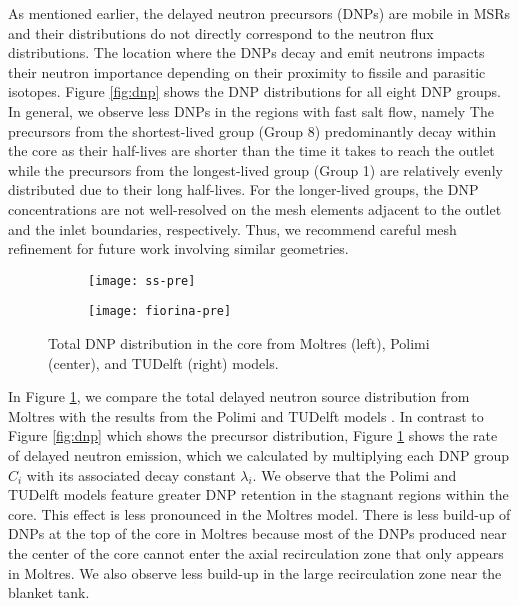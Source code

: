 As mentioned earlier, the delayed neutron precursors (DNPs) are mobile in
\glspl{MSR} and their distributions do not directly correspond to the neutron
flux distributions. The location where the \glspl{DNP} decay and emit neutrons
impacts their neutron
importance depending on their proximity to fissile and parasitic isotopes.
Figure \ref{fig:dnp} shows the \gls{DNP} distributions for all eight \gls{DNP}
groups. In general, we observe less \glspl{DNP} in the regions with fast salt
flow, namely
 The
precursors from the shortest-lived group (Group 8) predominantly decay within
the core as their half-lives are shorter than the time it takes to reach the
outlet while the precursors from the longest-lived group (Group 1) are
relatively evenly distributed due to their long half-lives. For the
longer-lived groups, the \gls{DNP} concentrations are not well-resolved on the
mesh elements adjacent to the outlet and the inlet boundaries, respectively.
Thus, we recommend careful mesh refinement for future work involving similar
geometries.

\begin{figure}[b!]
    \centering
    \begin{subfigure}[t]{.30\textwidth}
        \centering
        \vspace{.9cm}
        \texttt{[image: ss-pre]}
    \end{subfigure}
    \begin{subfigure}[t]{.69\textwidth}
        \centering
        \vspace{0pt}
        \texttt{[image: fiorina-pre]}
    \end{subfigure}
    \caption{Total \gls{DNP} distribution in the core from Moltres
    (left), Polimi (center), and TUDelft (right) models.}
    \label{fig:pre}
\end{figure}

In Figure \ref{fig:pre}, we compare the total delayed neutron source
distribution from Moltres with the results from the Polimi and TUDelft models
\cite{fiorina_modelling_2014}. In contrast to Figure \ref{fig:dnp} which shows
the precursor distribution, Figure \ref{fig:pre} shows the rate of delayed
neutron emission, which we calculated by multiplying each \gls{DNP} group
$C_i$ with its associated decay constant $\lambda_i$.
We observe that the Polimi and TUDelft models
feature greater \gls{DNP} retention in the stagnant regions within the core.
This effect is less pronounced in the Moltres model. There is less build-up
of \glspl{DNP} at the top of the core in Moltres because most of the
\glspl{DNP} produced near the center of the core cannot enter the axial
recirculation zone that only appears in Moltres. We also observe less build-up
in the large recirculation zone near the blanket tank.

